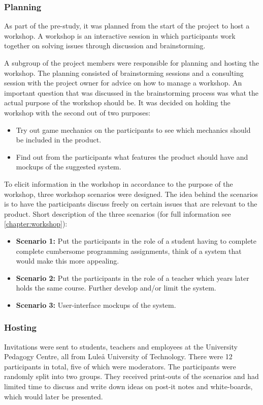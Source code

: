 \subsubsection{Planning}
As part of the pre-study, it was planned from the start of the project to host a workshop. A workshop is an interactive session in which participants work together on solving issues through discussion and brainstorming\cite{workshop}. 

A subgroup of the project members were responsible for planning and hosting the workshop. The planning consisted of brainstorming sessions and a consulting session with the project owner for advice on how to manage a workshop. An important question that was discussed in the brainstorming process was what the actual purpose of the workshop should be. It was decided on holding the workshop with the second out of two purposes:
\begin{itemize}  
    \item Try out game mechanics on the participants to see which mechanics should be included in the product.
    \item Find out from the participants what features the product should have and mockups of the suggested system. 
\end{itemize}

To elicit information in the workshop in accordance to the purpose of the workshop, three workshop scenarios were designed. The idea behind the scenarios is to have the participants discuss freely on certain issues that are relevant to the product. Short description of the three scenarios (for full information see \ref{chapter:workshop}):

\begin{itemize}  
    \item \textbf{Scenario 1:} Put the participants in the role of a student having to complete complete cumbersome programming assignments, think of a system that would make this more appealing.
    \item \textbf{Scenario 2:} Put the participants in the role of a teacher which years later holds the same course. Further develop and/or limit the system.
    \item \textbf{Scenario 3:} User-interface mockups of the system.
\end{itemize}
    
\subsubsection{Hosting}
Invitations were sent to students, teachers and employees at the University Pedagogy Centre, all from Luleå University of Technology. There were 12 participants in total, five of which were moderators. The participants were randomly split into two groups. They received print-outs of the scenarios and had limited time to discuss and write down ideas on post-it notes and white-boards, which would later be presented.

